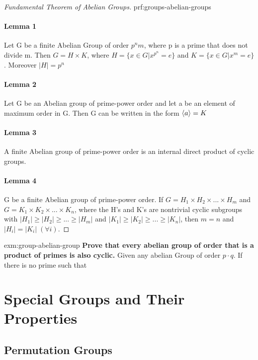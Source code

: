 \begin{proof}[Fundamental Theorem of Abelian Groups]{prf:groups-abelian-groups}
    \paragraph{Lemma 1} Let G be a finite Abelian Group of order $p^n m$, where p is a prime that does not divide m. Then $ G = H \times K $, where $ H = \{ x \in G | x^{p^n} = e \} $ and $ K = \{ x \in G | x^{m} = e \} $. Moreover $ |H| = p^n $
    \paragraph{Lemma 2} Let G be an Abelian group of prime-power order and let a be an element of maximum order in G. Then G can be written in the form $\braket{a} = K$
    \paragraph{Lemma 3} A finite Abelian group of prime-power order is an internal direct product of cyclic groups.
    \paragraph{Lemma 4} G be a finite Abelian group of prime-power order. If $ G = H_1 \times H_2 \times ... \times H_m$ and $G = K_1 \times K_2 \times ... \times K_n $, where the H’s and K’s are nontrivial cyclic subgroups with $|H_1| \geq |H_2| \geq ... \geq |H_m| $ and $ |K_1| \geq |K_2| \geq ... \geq |K_n| $, then $m = n$ and $|H_i| = |K_i| \; (\forall i)$.
\end{proof}

\begin{example}{exm:group-abelian-group}
    \textbf{Prove that every abelian group of order that is a product of primes is also cyclic.}
    Given any abelian Group of order $ p \cdot q $. If there is no prime such that
\end{example}



\section{Special Groups and Their Properties}

\subsection{Permutation Groups}

